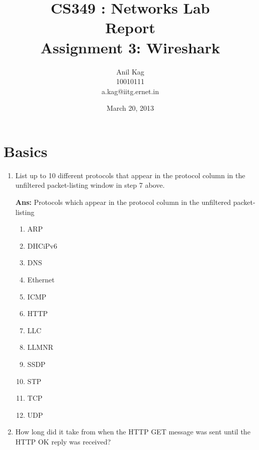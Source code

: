 \documentclass[a4,11pt]{article}
\newenvironment{que}
{ \color{YellowGreen}
  \begin{question}
}
{ \end{question} }
\newenvironment{sol}
{ \color{Black}
  \begin{solution}
}
{ \end{solution} }
\begin{document}
\title{CS349 : Networks Lab \\
	Report\\
	Assignment 3: Wireshark}
\author{Anil Kag\\
	   10010111\\
	   a.kag@iitg.ernet.in}
\date{March 20, 2013}
\maketitle


\section{Basics}
	  
\begin{enumerate}
 \item
  \begin{que}
    List up to 10 different protocols that appear in the protocol column in the unfiltered packet-listing window in step 7 above. 
  \end{que}
   
  \begin{sol}
   \textbf{Ans:} Protocols which appear in the protocol column in the unfiltered packet-listing
      \begin{multicols}{3}
	\begin{enumerate}
	\item ARP  	\item DHCiPv6
	\item DNS 	\item Ethernet 
	\item ICMP      	\item HTTP
	\item LLC        \item LLMNR
	\item SSDP       \item STP 
	\item TCP       	\item UDP
	\end{enumerate}
      \end{multicols}
    \end{sol}
    
    
    \item
    \begin{que} 
      How long did it take from when the HTTP GET message was sent until the HTTP OK reply was received? 
    \end{que}


\end{enumerate}
\end{document}
